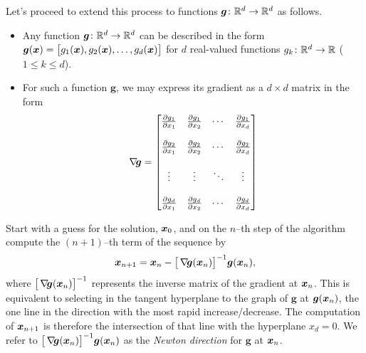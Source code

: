 Let's proceed to extend this process to functions $\boldsymbol{g} \colon \mathbb{R}^d \to \mathbb{R}^d$ as follows.  
\begin{itemize}
	\item Any function $\boldsymbol{g} \colon \mathbb{R}^d \to \mathbb{R}^d$ can be described in the form $\boldsymbol{g}(\boldsymbol{x}) = \big[ g_1(\boldsymbol{x}), g_2(\boldsymbol{x}), \dotsc, g_d(\boldsymbol{x}) \big]$ for $d$ real-valued functions $g_k\colon \mathbb{R}^d \to \mathbb{R}$ ($1\leq k \leq d$).
	\item For such a function $\boldsymbol{g}$, we may express its gradient as a $d\times d$ matrix in the form
	\begin{equation*}
	\mathop{\nabla\! {\boldsymbol{g}}} = \begin{bmatrix}
	\frac{\partial g_1}{\partial x_1} & \frac{\partial g_1}{\partial x_2} & \dotsb & \frac{\partial g_1}{\partial x_d} \\ \\
	\frac{\partial g_2}{\partial x_1} & \frac{\partial g_2}{\partial x_2} & \dotsb & \frac{\partial g_2}{\partial x_d} \\ \\
	\vdots & \vdots & \ddots & \vdots \\ \\
	\frac{\partial g_d}{\partial x_1} & \frac{\partial g_d}{\partial x_2} & \dotsb & \frac{\partial g_d}{\partial x_d} \\
	\end{bmatrix}
	\end{equation*}
\end{itemize}
Start with a guess for the solution, $\boldsymbol{x}_0$, and on the $n$--th step of the algorithm compute the $(n+1)$--th term of the sequence by
\begin{equation}\label{equation:NewtonMethod}
\boldsymbol{x}_{n+1} = \boldsymbol{x}_n - \big[ \mathop{\nabla\! {\boldsymbol{g}}}(\boldsymbol{x}_n) \big]^{-1} \boldsymbol{g}(\boldsymbol{x}_n),
\end{equation}
where $\big[ \mathop{\nabla\! {\boldsymbol{g}}}(\boldsymbol{x}_n) \big]^{-1}$ represents the inverse matrix of the gradient at $\boldsymbol{x}_n$.  This is equivalent to selecting in the tangent hyperplane to the graph of $\boldsymbol{g}$ at $\boldsymbol{g}(\boldsymbol{x}_n)$, the one line in the direction with the most rapid increase/decrease.  The computation of $\boldsymbol{x}_{n+1}$ is therefore the intersection of that line with the hyperplane $x_d=0$.  We refer to $\big[ \mathop{\nabla\! {\boldsymbol{g}}}(\boldsymbol{x}_n) \big]^{-1} \boldsymbol{g}(\boldsymbol{x}_n)$ as the \emph{Newton direction} for $\boldsymbol{g}$ at $\boldsymbol{x}_n$.

